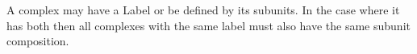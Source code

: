 A complex may have a Label or be defined by its subunits. In the case where it has both then all complexes with the same label must also have the same subunit composition.





